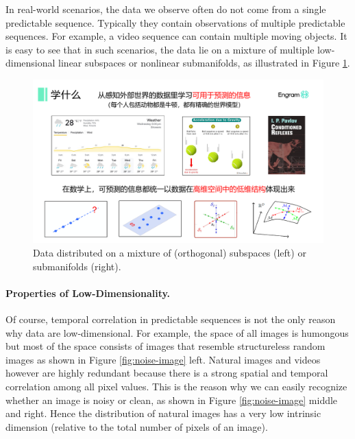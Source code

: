\documentclass[../../book-main.tex]{subfiles}
\begin{document}
In real-world scenarios, the data we observe often do not come from a single predictable sequence. Typically they contain observations of multiple predictable sequences. For example, a video sequence can contain multiple moving objects. It is easy to see that in such scenarios, the data lie on a mixture of multiple low-dimensional linear subspaces or nonlinear submanifolds, as illustrated in Figure \ref{fig:mixture-models}. 
\begin{figure}
    \centering
    \includegraphics[width=0.8\linewidth]{figures/mixture.pdf}
    \caption{Data distributed on a mixture of (orthogonal) subspaces (left) or submanifolds (right).}
    \label{fig:mixture-models}
\end{figure}


\paragraph{Properties of Low-Dimensionality.}
Of course, temporal correlation in predictable sequences is not the only reason why data are low-dimensional. For example, the space of all images is humongous but most of the space consists of images that resemble structureless random images as shown in Figure \ref{fig:noise-image} left. Natural images and videos however are highly redundant because there is a strong spatial and temporal correlation among all pixel values. This is the reason why we can easily recognize whether an image is noisy or clean, as shown in Figure \ref{fig:noise-image} middle and right. Hence the distribution of natural images has a very low intrinsic dimension (relative to the total number of pixels of an image).
\end{document}
